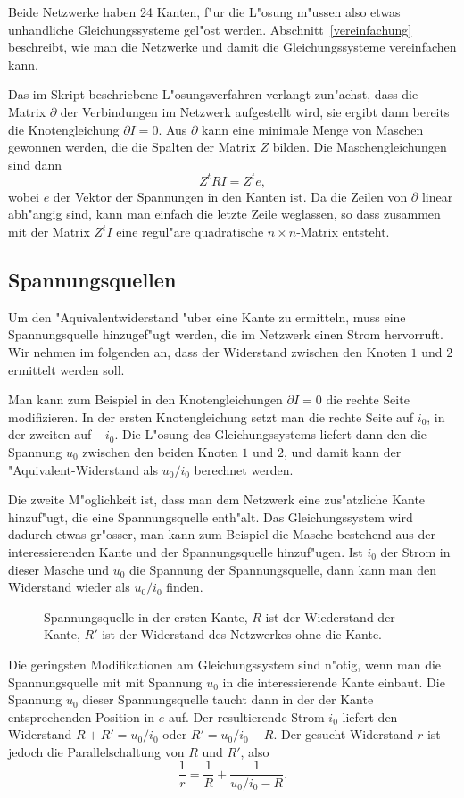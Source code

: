 \documentclass[a4paper,12pt]{article}
\begin{document}
Beide Netzwerke haben 24 Kanten, f"ur die L"osung m"ussen also etwas
unhandliche Gleichungssysteme gel"ost werden.
Abschnitt~\ref{vereinfachung} beschreibt, wie man die Netzwerke und
damit die Gleichungssysteme vereinfachen kann.

Das im Skript beschriebene L"osungsverfahren verlangt zun"achst,
dass die Matrix $\partial$ der Verbindungen im Netzwerk aufgestellt
wird, sie ergibt dann bereits die Knotengleichung $\partial I=0$.
Aus $\partial$ kann eine minimale Menge von Maschen gewonnen werden,
die die Spalten der Matrix $Z$ bilden.
Die Maschengleichungen sind dann
\[
Z^tRI=Z^te,
\]
wobei $e$ der Vektor der Spannungen in den Kanten ist.
Da die Zeilen von $\partial$ linear abh"angig sind, kann man
einfach die letzte Zeile weglassen, so dass zusammen mit der Matrix $Z^tI$
eine regul"are quadratische $n\times n$-Matrix entsteht.


\subsection{Spannungsquellen\label{quelle}}
Um den "Aquivalentwiderstand "uber eine Kante zu ermitteln, muss
eine Spannungsquelle hinzugef"ugt werden, die im Netzwerk einen
Strom hervorruft.
Wir nehmen im folgenden an, dass der Widerstand zwischen den Knoten
$1$ und $2$ ermittelt werden soll.

Man kann zum Beispiel in den Knotengleichungen $\partial I=0$
die rechte Seite modifizieren.
In der ersten Knotengleichung setzt man die rechte Seite auf $i_0$,
in der zweiten auf $-i_0$.
Die L"osung des Gleichungssystems liefert dann den die Spannung $u_0$ zwischen
den beiden Knoten $1$ und $2$, und damit kann der "Aquivalent-Widerstand
als $u_0/i_0$ berechnet werden.

Die zweite M"oglichkeit ist, dass man dem Netzwerk eine zus"atzliche
Kante hinzuf"ugt, die eine Spannungsquelle enth"alt. 
Das Gleichungssystem wird dadurch etwas gr"osser, man kann zum
Beispiel die Masche bestehend aus der interessierenden Kante und
der Spannungsquelle hinzuf"ugen.
Ist $i_0$ der Strom in dieser Masche und $u_0$ die Spannung der
Spannungsquelle, dann kann man den Widerstand wieder als $u_0/i_0$
finden.

\begin{figure}
\centering

\caption{Spannungsquelle in der ersten Kante, $R$ ist der Wiederstand
der Kante, $R'$ ist der Widerstand des Netzwerkes ohne die Kante.
\label{spannungsquelle}}
\end{figure}
Die geringsten Modifikationen am Gleichungssystem sind n"otig, wenn
man die Spannungsquelle mit mit Spannung $u_0$ in die interessierende
Kante einbaut.
Die Spannung $u_0$ dieser Spannungsquelle taucht dann in der
der Kante entsprechenden Position in $e$ auf.
Der resultierende Strom $i_0$ liefert den Widerstand $R+R'=u_0/i_0$
oder $R'=u_0/i_0-R$.
Der gesucht Widerstand $r$ ist jedoch die Parallelschaltung von $R$ und $R'$,
also
\[
\frac1r=\frac1{R}+\frac1{u_0/i_0-R}.
\]
\end{document}
